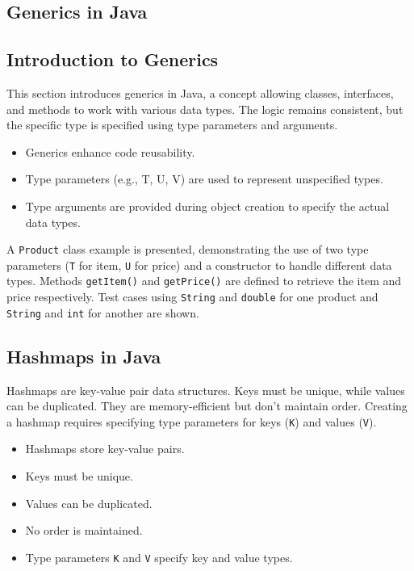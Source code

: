 \documentclass{article}
\begin{document}
\begin{itemize}
\section{Generics in Java}

\subsection{Introduction to Generics}

This section introduces generics in Java, a concept allowing classes, interfaces, and methods to work with various data types.  The logic remains consistent, but the specific type is specified using type parameters and arguments.

\begin{itemize}
    \item Generics enhance code reusability.
    \item Type parameters (e.g., T, U, V) are used to represent unspecified types.
    \item Type arguments are provided during object creation to specify the actual data types.
\end{itemize}

A \texttt{Product} class example is presented, demonstrating the use of two type parameters (\texttt{T} for item, \texttt{U} for price) and a constructor to handle different data types.  Methods \texttt{getItem()} and \texttt{getPrice()} are defined to retrieve the item and price respectively.  Test cases using \texttt{String} and \texttt{double} for one product and \texttt{String} and \texttt{int} for another are shown.


\subsection{Hashmaps in Java}

Hashmaps are key-value pair data structures. Keys must be unique, while values can be duplicated. They are memory-efficient but don't maintain order.  Creating a hashmap requires specifying type parameters for keys (\texttt{K}) and values (\texttt{V}).

\begin{itemize}
    \item Hashmaps store key-value pairs.
    \item Keys must be unique.
    \item Values can be duplicated.
    \item No order is maintained.
    \item Type parameters \texttt{K} and \texttt{V} specify key and value types.
\end{itemize}


\end{itemize}
\end{document}
